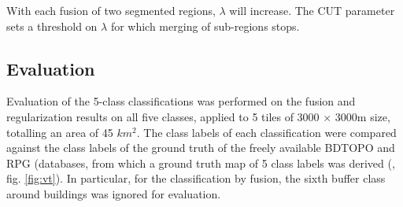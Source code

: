 \documentclass[10pt]{article}
\begin{document}
With each fusion of two segmented regions, $\lambda$ will increase. The CUT parameter sets a threshold on $\lambda$ for which merging of sub-regions stops.

\subsection{Evaluation}

Evaluation of the 5-class classifications was performed on the fusion and regularization results on all five classes, applied to 5 tiles of 3000 $\times$ 3000m size, totalling an area of 45 $km^2$. The class labels of each classification were compared against the class labels of the ground truth of the freely available BDTOPO and RPG (databases, from which a ground truth map of 5 class labels was derived (\cite{bdtopo,RPG}, fig. \ref{fig:vt}). In particular, for the classification by fusion, the sixth buffer class around buildings was ignored for evaluation.\\
\end{document}
